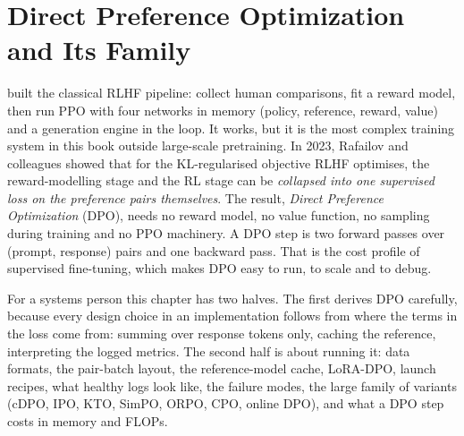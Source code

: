 \chapter{Direct Preference Optimization and Its Family}\label{ch:dpo}

 built the classical RLHF pipeline: collect human comparisons, fit a reward
model, then run PPO with four networks in memory (policy, reference, reward, value) and a
generation engine in the loop. It works, but it is the most complex training system in this book
outside large-scale pretraining. In 2023, Rafailov and colleagues showed that for the
KL-regularised objective RLHF optimises, the reward-modelling stage and the RL stage can be
\emph{collapsed into one supervised loss on the preference pairs themselves}. The result,
\emph{Direct Preference Optimization} (DPO), needs no reward model, no value function, no sampling
during training and no PPO machinery. A DPO step is two forward passes over (prompt, response)
pairs and one backward pass. That is the cost profile of supervised fine-tuning, which makes DPO
easy to run, to scale and to debug.

For a systems person this chapter has two halves. The first derives DPO carefully, because
every design choice in an implementation follows from where the terms in the loss come from:
summing over response tokens only, caching the reference, interpreting the logged metrics. The
second half is about running it: data formats, the pair-batch layout, the reference-model cache,
LoRA-DPO, launch recipes, what healthy logs look like, the failure modes, the large family of
variants (cDPO, IPO, KTO, SimPO, ORPO, CPO, online DPO), and what a DPO step costs in memory
and FLOPs.

